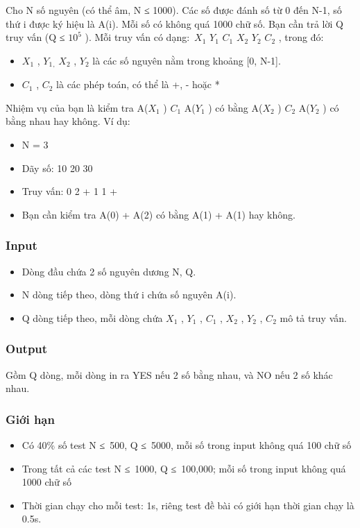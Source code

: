 



   Cho N số nguyên (có thể âm, N ≤ 1000). Các số được đánh số từ 0 đến N-1, số thứ i được ký hiệu là A(i). Mỗi số có không quá 1000 chữ số. Bạn cần trả lời Q truy vấn (Q ≤ $10^{5}$   ). Mỗi truy vấn có dạng: $X_{1}$   $Y_{1}$   $C_{1}$   $X_{2}$   $Y_{2}$   $C_{2}$   , trong đó:  
\begin{itemize}
	\item     $X_{1}$    , $Y_{1}$$_     ,    $    $X_{2}$    , $Y_{2}$    là các số nguyên nằm trong khoảng [0, N-1].   
	\item     $C_{1}$    , $C_{2}$    là các phép toán, có thể là +, - hoặc *   
\end{itemize}

   Nhiệm vụ của bạn là kiểm tra A($X_{1}$   ) $C_{1}$   A($Y_{1}$   ) có bằng A($X_{2}$   ) $C_{2}$   A($Y_{2}$   ) có bằng nhau hay không. Ví dụ:  
\begin{itemize}
	\item     N = 3   
	\item     Dãy số: 10 20 30   
	\item     Truy vấn: 0 2 + 1 1 +   
	\item     Bạn cần kiểm tra A(0) + A(2) có bằng A(1) + A(1) hay không.   
\end{itemize}

\subsubsection{   Input  }
\begin{itemize}
	\item      Dòng đầu chứa 2 số nguyên dương N, Q.    
	\item      N dòng tiếp theo, dòng thứ i chứa số nguyên A(i).    
	\item     Q dòng tiếp theo, mỗi dòng chứa $X_{1}$    , $Y_{1}$    , $C_{1}$    , $X_{2}$    , $Y_{2}$    , $C_{2}$    mô tả truy vấn.   
\end{itemize}

\subsubsection{   Output  }

   Gồm Q dòng, mỗi dòng in ra YES nếu 2 số bằng nhau, và NO nếu 2 số khác nhau.  

\subsubsection{   Giới hạn  }
\begin{itemize}
	\item     Có 40\% số test N ≤ 500, Q ≤ 5000, mỗi số trong input không quá 100 chữ số   
	\item     Trong tất cả các test N ≤ 1000, Q ≤ 100,000; mỗi số trong input không quá 1000 chữ số   
	\item     Thời gian chạy cho mỗi test: 1s, riêng test đề bài có giới hạn thời gian chạy là 0.5s.   
\end{itemize}

